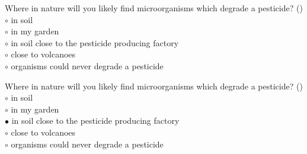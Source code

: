 \documentclass[]{beamer}
\begin{document}
\begin{frame}[shrink] {}
\addtocounter{questions}{1}
\color{blue}
Where in nature will you likely find microorganisms which degrade a
pesticide? ()\\
\color{black}
\setlength{\parindent}{-0.4cm}
{\color{red}$\circ$} in soil\\
{\color{red}$\circ$} in my garden\\
{\color{red}$\circ$} in soil close to the pesticide producing factory\\
{\color{red}$\circ$} close to volcanoes\\
{\color{red}$\circ$} organisms could never degrade a pesticide
\end{frame}
\begin{frame}[shrink] {}
\addtocounter{answers}{1}
\color{blue}
Where in nature will you likely find microorganisms which degrade a
pesticide? ()\\
\color{black}
\setlength{\parindent}{-0.4cm}
{\color{red}$\circ$} in soil\\
{\color{red}$\circ$} in my garden\\
{\color{red}$\bullet$} in soil close to the pesticide producing factory\\
{\color{red}$\circ$} close to volcanoes\\
{\color{red}$\circ$} organisms could never degrade a pesticide
\end{frame}
\end{document}
